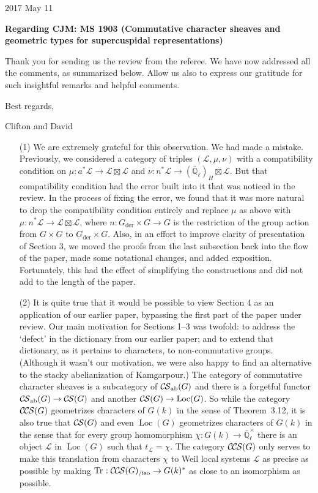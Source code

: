 \documentclass[letter,10pt]{amsart}
\theoremstyle{plain}
\theoremstyle{definition}
\newcommand{\EE}{\mathbb{\bar Q}_\ell}
\newcommand{\Fq}{k}
\newcommand{\EEx}{\EE^\times}
\DeclareMathOperator{\Loc}{Loc}
\newcommand{\der}{_{\operatorname{der}}}
\newcommand{\ab}{_{\operatorname{ab}}}
\newcommand{\trFrob}[1]{t_{#1}}
\DeclareMathOperator{\Tr}{Tr}
\newcommand{\TrFrob}[1]{\Tr_{#1}}
\newcommand{\cs}[1]{{\mathcal{#1}}}
\newcommand{\CS}{{\mathcal{C\hskip-0.8pt S}}}
\newcommand{\CCS}{{\mathcal{C\hskip-.8pt C\hskip-0.8pt S}}}
\newcommand{\CCSiso}[1]{\CCS(#1)_{/\text{iso}}}
\begin{document}
{\hfill {2017 May 11} \\ 
}

\setcounter{equation}{-1}


\noindent\textbf{Regarding CJM: MS 1903 (Commutative character sheaves and geometric types for supercuspidal representations)} %

\bigskip

\medskip


Thank you for sending us the review from the referee. We have now addressed all the comments, as summarized below. Allow us also to express our gratitude for such  insightful remarks and helpful comments.
\medskip

Best  regards,
\bigskip

Clifton and David

\bigskip

\begin{enumerate}
\item[(1)] We are extremely grateful for this observation. We had made a mistake. Previously, we considered a category of triples $(\cs{L},\mu,\nu)$ with a compatibility condition on $\mu : a^*\cs{L} \to \cs{L}\boxtimes\cs{L}$ and $\nu : n^* \cs{L}\to (\EE)_{H}\boxtimes \cs{L}$. But that compatibility condition had the error built into it that was noticed in the review. In the process of fixing the error, we found that it was more natural to drop the compatibility condition entirely and replace $\mu$ as above with $\mu : n^*\cs{L} \to \cs{L}\boxtimes\cs{L}$, where $n: G\der\times G\to G$ is the restriction of the group action from $G\times G$ to $G\der\times G$. Also, in an effort to improve clarity of presentation of Section 3, we moved the proofs from the last subsection back into the flow of the paper, made some notational changes, and added exposition.
Fortunately, this had the effect of simplifying the constructions and did not add to the length of the paper. 
\item[(2)] It is quite true that it would be possible to view Section 4 as an application of our earlier paper, bypassing the first part of the paper under review. Our main motivation for Sections 1--3 was twofold: to address the `defect' in the dictionary from our earlier paper; and to extend that dictionary, as it pertains to characters, to non-commutative groups. (Although it wasn't our motivation, we were also happy to find an alternative to the stacky abelianization of Kamgarpour.) 
The category of commutative character sheaves is a subcategory of $\CS\ab(G)$ and there is a forgetful functor $\CS\ab(G) \to \CS(G)$ and another $\CS(G)\to \Loc(G)$.
So while the category $\CCS(G)$ geometrizes characters of $G(\Fq)$ in the sense of Theorem~3.12, it is also true that $\CS(G)$ and even $\Loc(G)$ geometrizes characters of $G(\Fq)$ in the sense that for every group homomorphism $\chi : G(\Fq) \to \EEx$ there is an object $\cs{L}$ in $\Loc(G)$ such that $\trFrob{\cs{L}} = \chi$.
The category $\CCS(G)$ only serves to make this translation from characters $\chi$ to Weil local systems $\cs{L}$ as precise as possible by making $\TrFrob{} : \CCSiso{G} \to G(k)^*$ as close to an isomorphism as possible.
\end{enumerate}
\end{document}
